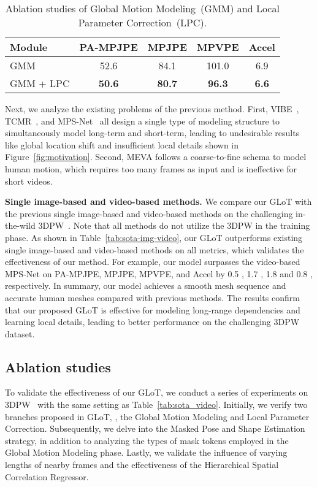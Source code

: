\documentclass[10pt,twocolumn,letterpaper]{article}
\begin{document}
		\begin{table}[!t]
			\small
			\setlength{\tabcolsep}{4.8 pt}
\begin{center}
				\begin{tabular}{l | c | c | c | c}
\toprule[2pt]
					\normalsize
					Module & PA-MPJPE & MPJPE & MPVPE & Accel \\
					\midrule[1pt]
					GMM & 52.6 & 84.1 & 101.0 & 6.9 \\
					\cellcolor{Gray}GMM + LPC & \cellcolor{Gray}\textbf{50.6} & \cellcolor{Gray}\textbf{80.7} & \cellcolor{Gray}\textbf{96.3} & \cellcolor{Gray}\textbf{6.6} \\
					\bottomrule[1pt]
\end{tabular}
			\end{center}
			\vspace{-1.5 em}
			\caption{Ablation studies of Global Motion Modeling~(GMM) and Local Parameter Correction~(LPC).}
			\vspace{-1.5 em}
			\label{tab:gmmlpc}
		\end{table}
		Next, we analyze the existing problems of the previous method. 
		First, VIBE~\cite{VIBE}, TCMR~\cite{TCMR}, and MPS-Net~\cite{MPS-net} all design a single type of modeling structure to simultaneously model long-term and short-term, leading to undesirable results like global location shift and insufficient local details shown in Figure~\ref{fig:motivation}.
		Second, MEVA follows a coarse-to-fine schema to model human motion, which requires too many frames as input and is ineffective for short videos.
		
		\noindent\textbf{Single image-based and video-based methods.} We compare our GLoT with the previous single image-based and video-based methods on the challenging in-the-wild 3DPW~\cite{3DPW}. Note that all methods do not utilize the 3DPW in the training phase. 
		As shown in Table~\ref{tab:sota-img-video}, our GLoT outperforms existing single image-based and video-based methods on all metrics, which validates the effectiveness of our method.
		For example, our model surpasses the video-based MPS-Net on PA-MPJPE, MPJPE, MPVPE, and Accel by 0.5 , 1.7 , 1.8  and 0.8 , respectively. In summary, our model achieves a smooth mesh sequence and accurate human meshes compared with previous methods. The results confirm that our proposed GLoT is effective for modeling long-range dependencies and learning local details, leading to better performance on the challenging 3DPW dataset.
		
		\subsection{Ablation studies}
		To validate the effectiveness of our GLoT, we conduct a series of experiments on 3DPW~\cite{3DPW} with the same setting as Table~\ref{tab:sota_video}.
            Initially, we verify two branches proposed in GLoT, \ie, the Global Motion Modeling and Local Parameter Correction. Subsequently, we delve into the Masked Pose and Shape Estimation strategy, in addition to analyzing the types of mask tokens employed in the Global Motion Modeling phase. Lastly, we validate the influence of varying lengths of nearby frames and the effectiveness of the Hierarchical Spatial Correlation Regressor.
\end{document}

